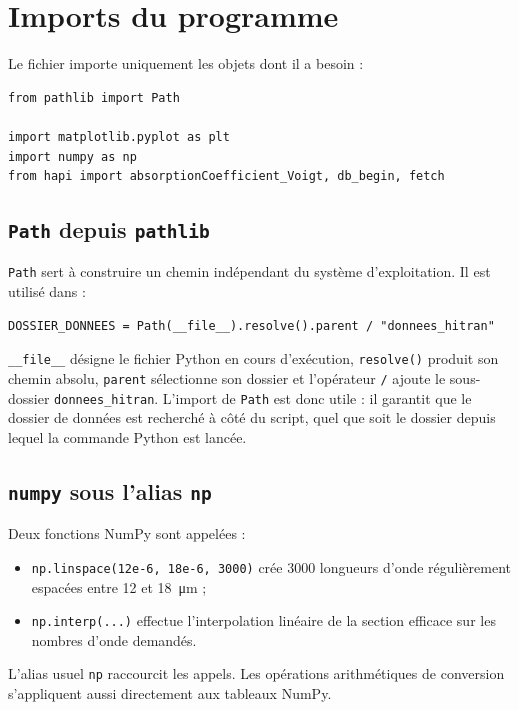 \documentclass[11pt,a4paper]{article}
\newcommand{\code}[1]{\texttt{#1}}
\begin{document}
\section{Imports du programme}

Le fichier importe uniquement les objets dont il a besoin :

\begin{lstlisting}
from pathlib import Path

import matplotlib.pyplot as plt
import numpy as np
from hapi import absorptionCoefficient_Voigt, db_begin, fetch
\end{lstlisting}

\subsection{\code{Path} depuis \code{pathlib}}

\code{Path} sert à construire un chemin indépendant du système
d'exploitation. Il est utilisé dans :

\begin{lstlisting}
DOSSIER_DONNEES = Path(__file__).resolve().parent / "donnees_hitran"
\end{lstlisting}

\code{\_\_file\_\_} désigne le fichier Python en cours d'exécution,
\code{resolve()} produit son chemin absolu, \code{parent} sélectionne son
dossier et l'opérateur \code{/} ajoute le sous-dossier
\code{donnees\_hitran}. L'import de \code{Path} est donc utile : il garantit
que le dossier de données est recherché à côté du script, quel que soit le
dossier depuis lequel la commande Python est lancée.

\subsection{\code{numpy} sous l'alias \code{np}}

Deux fonctions NumPy sont appelées :

\begin{itemize}
  \item \code{np.linspace(12e-6, 18e-6, 3000)} crée 3000 longueurs d'onde
        régulièrement espacées entre 12 et \SI{18}{\micro\metre} ;
  \item \code{np.interp(...)} effectue l'interpolation linéaire de la section
        efficace sur les nombres d'onde demandés.
\end{itemize}

L'alias usuel \code{np} raccourcit les appels. Les opérations arithmétiques de
conversion s'appliquent aussi directement aux tableaux NumPy.
\end{document}
